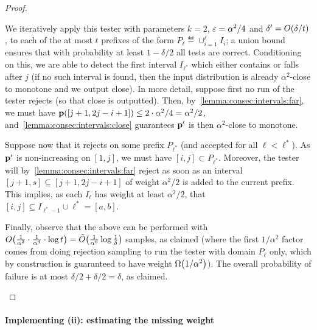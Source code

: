 \begin{proof}
\begin{itemize}
  We iteratively apply this tester with parameters $k=2$, $\varepsilon=\alpha^2/4$ and $\delta^\prime=\bigO{\delta/t}$, to each of the at most $t$ prefixes of the form $P_\ell\eqdef \cup_{i=1}^\ell I_i$; a union bound ensures that with probability at least $1-\delta/2$ all tests are correct. Conditioning on this, we are able to detect the first interval $I_{\ell^\ast}$ which either contains or falls after $j$ (if no such interval is found, then the input distribution is already $\alpha^2$-close to monotone and we output \textsf{close}).   
  In more detail, suppose first no run of the tester rejects (so that \textsf{close} is outputted). Then, by~\cref{lemma:consec:intervals:far}, we must have $\mathbf{p}([j+1,2j-i+1])\leq 2\cdot\alpha^2/4=\alpha^2/2$, and~\cref{lemma:consec:intervals:close} guarantees $\mathbf{p}^\prime$ is then $\alpha^2$-close to monotone.
  
  Suppose now that it rejects on some prefix $P_{\ell^\ast}$ (and accepted for all $\ell < \ell^\ast$). As $\mathbf{p}^\prime$ is non-increasing on $[1,j]$, we must have $[i,j]\subset P_{\ell^\ast}$. Moreover, the tester will by~\cref{lemma:consec:intervals:far} reject as soon as an interval $[j+1,s]\subseteq [j+1,2j-i+1]$ of weight $\alpha^2/2$ is added to the current prefix. This implies, as each $I_\ell$ has weight at least $\alpha^2/2$, that $[i,j]\subseteq I_{\ell^\ast-1}\cup {\ell^\ast}=[a,b]$.
  
  Finally, observe that the above can be performed with $\bigO{\frac{1}{\alpha^2}\cdot \frac{1}{\alpha^4} \cdot \log t}=\tildeO{\frac{1}{\alpha^6}\log\frac{1}{\delta}}$ samples, as claimed (where the first $1/\alpha^2$ factor comes from doing rejection sampling to run the tester with domain $P_\ell$ only, which by construction is guaranteed to have weight $\bigOmega{1/\alpha^2}$). The overall probability of failure is at most $\delta/2+\delta/2=\delta$, as claimed.
  \end{itemize} 
\end{proof}

\paragraph{Implementing \textsf{(ii)}: estimating the missing weight}

